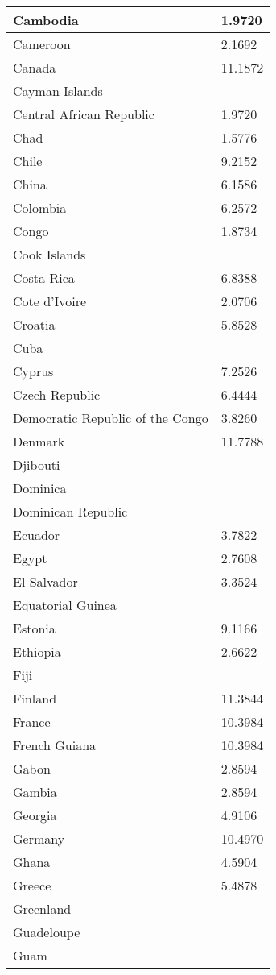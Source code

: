 \documentclass[12pt]{article}
\begin{document}
\begin{longtable}{|p{}|p{}|}
Cambodia&1.9720 \\\hline
Cameroon&2.1692 \\\hline
Canada&11.1872 \\\hline
Cayman Islands& \\\hline
Central African Republic&1.9720 \\\hline
Chad&1.5776 \\\hline
Chile&9.2152 \\\hline
China&6.1586 \\\hline
Colombia&6.2572 \\\hline
Congo&1.8734 \\\hline
Cook Islands& \\\hline
Costa Rica&6.8388 \\\hline
Cote d'Ivoire&2.0706 \\\hline
Croatia&5.8528 \\\hline
Cuba& \\\hline
Cyprus&7.2526 \\\hline
Czech Republic&6.4444 \\\hline
Democratic Republic of the Congo&3.8260 \\\hline
Denmark&11.7788 \\\hline
Djibouti& \\\hline
Dominica& \\\hline
Dominican Republic& \\\hline
Ecuador&3.7822 \\\hline
Egypt&2.7608 \\\hline
El Salvador&3.3524 \\\hline
Equatorial Guinea& \\\hline
Estonia&9.1166 \\\hline
Ethiopia&2.6622 \\\hline
Fiji& \\\hline
Finland&11.3844 \\\hline
France&10.3984 \\\hline
French Guiana&10.3984 \\\hline
Gabon&2.8594 \\\hline
Gambia&2.8594 \\\hline
Georgia&4.9106 \\\hline
Germany&10.4970 \\\hline
Ghana&4.5904 \\\hline
Greece&5.4878 \\\hline
Greenland& \\\hline
Guadeloupe& \\\hline
Guam& \\\hline

\end{longtable}
\end{document}
